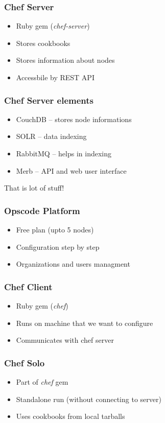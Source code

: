 \documentclass[16pt]{beamer}
\begin{document}
\begin{frame}
  \frametitle{Chef Server}
  \begin{itemize}
    \item Ruby gem (\emph{chef-server})
    \item Stores cookbooks
    \item Stores information about nodes
    \item Accessbile by REST API
  \end{itemize}
\end{frame}

\begin{frame}
  \frametitle{Chef Server elements}
  \begin{itemize}
    \item CouchDB -- stores node informations
    \item SOLR -- data indexing
    \item RabbitMQ -- helps in indexing
    \item Merb -- API and web user interface
  \end{itemize}
  \pause
  \begin{center}
    \LARGE \color{red} That is lot of stuff!
  \end{center}
\end{frame}

\begin{frame}
  \frametitle{Opscode Platform}
  \begin{itemize}
    \item Free plan (upto 5 nodes)
    \item Configuration step by step
    \item Organizations and users managment
  \end{itemize}
\end{frame}

\begin{frame}
  \frametitle{Chef Client}
  \begin{itemize}
    \item Ruby gem (\emph{chef})
    \item Runs on machine that we want to configure
    \item Communicates with chef server
  \end{itemize}
\end{frame}

\begin{frame}
  \frametitle{Chef Solo}
  \begin{itemize}
    \item Part of \emph{chef} gem
    \item Standalone run (without connecting to server)
    \item Uses cookbooks from local tarballs
  \end{itemize}
\end{frame}
\end{document}
